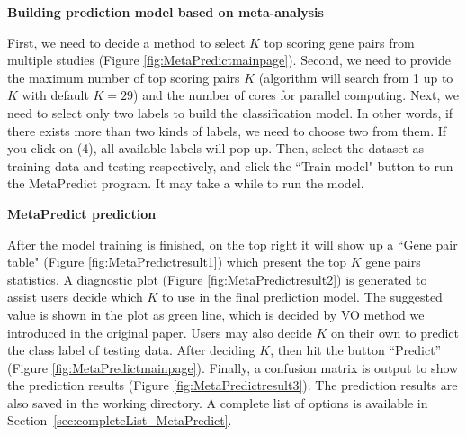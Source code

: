 \begin{steps}
\item \textbf{Building prediction model based on meta-analysis}

First, we need to decide a method to select $K$ top scoring gene pairs from multiple studies (Figure \ref{fig:MetaPredictmainpage}). 
Second, we need to provide the maximum number of top scoring pairs $K$ (algorithm will search from 1 up to $K$ with default $K = 29$) and the number of cores for parallel computing. 
Next, we need to select only two labels to build the classification model. 
In other words, if there exists more than two kinds of labels, we need to choose two from them. 
If you click on {\color{red} (4)}, all available labels will pop up.
Then, select the dataset as training data and testing respectively, 
and click the ``Train model" button to run the MetaPredict program. 
It may take a while to run the model.

\item \textbf{MetaPredict prediction}

After the model training is finished, on the top right it will show up a ``Gene pair table" (Figure \ref{fig:MetaPredictresult1}) which present the top $K$ gene pairs statistics. 
A diagnostic plot (Figure \ref{fig:MetaPredictresult2}) is generated to assist users decide which $K$ to use in the final prediction model. 
The suggested value is shown in the plot as green line, which is decided by VO method we introduced in the original paper. Users may also decide $K$ on their own to predict the class label of testing data. 
After deciding $K$, then hit the button ``Predict'' (Figure \ref{fig:MetaPredictmainpage}). 
Finally, a confusion matrix is output to show the prediction results (Figure \ref{fig:MetaPredictresult3}).
The prediction results are also saved in the working directory.
A complete list of options is available in Section~\ref{sec:completeList_MetaPredict}.

\end{steps}

